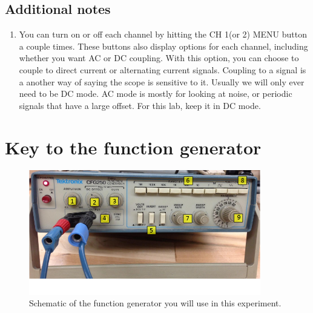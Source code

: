 \subsection*{Additional notes}
\begin{enumerate}
\item You can turn on or off each channel by hitting the CH 1(or 2) MENU button a couple times. These buttons also display options for each channel, including whether you want AC or DC coupling. With this option, you can choose to couple to direct current or alternating current signals. Coupling to a signal is a another way of saying the scope is sensitive to it. Usually we will only ever need to be DC mode. AC mode is mostly for looking at noise, or periodic signals that have a large offset. For this lab, keep it in DC mode.
\end{enumerate}

\newpage

\section*{Key to the function generator}

\begin{figure}[h!]
        \centering
            \includegraphics[width=0.9\textwidth]{./Exp9/pic/fgen.png}
        \caption{Schematic of the function generator you will use in this experiment.}
        \label{fig:gen}
\end{figure}



